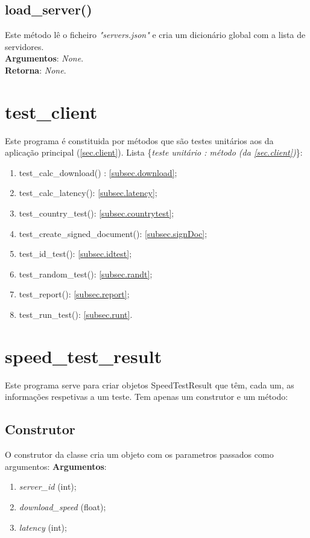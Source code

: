 \documentclass{report}
\begin{document}
\subsection{load\_server()}
Este método lê o ficheiro \textit{"servers.json"} e cria um dicionário global com a lista de servidores.\\
\textbf{Argumentos}:
\textit{None}.\\
\textbf{Retorna}: \textit{None}.

\section{test\_client}
Este programa é constituida por métodos que são testes unitários aos da aplicação principal (\autoref{sec.client}). Lista \{\textit{teste unitário : método (da \autoref{sec.client})}\}:
\begin{enumerate}
\item test\_calc\_download() : \autoref{subsec.download};
\item test\_calc\_latency(): \autoref{subsec.latency};
\item test\_country\_test(): \autoref{subsec.countrytest};
\item test\_create\_signed\_document(): \autoref{subsec.signDoc};
\item test\_id\_test(): \autoref{subsec.idtest};
\item test\_random\_test(): \autoref{subsec.randt};
\item test\_report(): \autoref{subsec.report};
\item test\_run\_test(): \autoref{subsec.runt}.
\end{enumerate}

\section{speed\_test\_result}
Este programa serve para criar objetos SpeedTestResult que têm, cada um, as informações respetivas a um teste. Tem apenas um construtor e um método:
\subsection{Construtor}
O construtor da classe cria um objeto com os parametros passados como argumentos:
\textbf{Argumentos}:
\begin{enumerate}
\item \textit{server\_id} (int);
\item \textit{download\_speed} (float);
\item \textit{latency} (int);
\end{enumerate}
\end{document}
